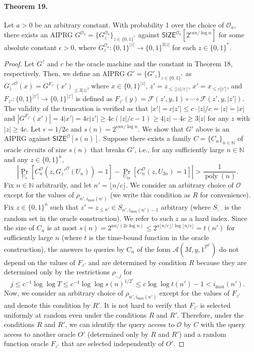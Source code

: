 \paragraph{Theorem 19.}
Let $a>0$ be an arbitrary constant. With probability 1 over the choice of $\mathcal O_a$, there exists an AIPRG $G^{\mathcal O_a}=\{G_z^{\mathcal O_a}\}_{z\in\{0,1\}^*}$ against $\mathsf{SIZE}^{\mathcal O_a}[2^{\epsilon an/\log n}]$ for some absolute constant $\epsilon>0$, where $G_z^{\mathcal O_a}:\{0,1\}^{|z|}\to\{0,1\}^{3|z|}$ for each $z\in\{0,1\}^*$.
\begin{proof}
Let $G^?$ and $c$ be the oracle machine and the constant in Theorem 18, respectively. Then, we define an AIPRG $G'=\{G'_z\}_{z\in\{0,1\}^*}$ as $G_z'^{\mathcal O}(x)=G^{F_{z'}}(x')_{\leq3|z|}$, where $x\in\{0,1\}^{|z|}$, $z'=z_{\leq\lfloor|z|/c\rfloor}$, $x'=x_{\leq c|z'|}$, and $F_{z'}:\{0,1\}^{|z'|}\to\{0,1\}^{|z'|}$ is defined as $F_{z'}(y)=\mathcal F(z',y,1)\circ\cdots\circ\mathcal F(z',y,|z'|)$. The validity of the truncation is verified as that $|x'|=c|z'|\leq c\cdot|z|/c=|z|=|x|$ and $|G^{F_{z'}}(x')|=4|x'|=4c|z'|\geq4c(|z|/c-1)\geq4|z|-4c\geq3|z|$ for any $z$ with $|z|\geq4c$.
Let $\epsilon=1/2c$ and $s(n)=2^{\epsilon an/\log n}$. We show that $G'$ above is an AIPRG against $\mathsf{SIZE}^{\mathcal O}[s(n)]$. Suppose there exists a family $C=\{C_n\}_{n\in\mathbb N}$ of oracle circuits of size $s(n)$ that breaks $G'$, i.e., for any sufficiently large $n\in\mathbb N$ and any $z\in\{0,1\}^n$,
\[\left|\Pr_{U_n}[C_n^{\mathcal O}(z,G_z'^{\mathcal O}(U_n))=1]-\Pr_{U_{3n}}[C_n^{\mathcal O}(z,U_{3n})=1]\right|>\frac1{\operatorname{poly}(n)}.\]
Fix $n\in\mathbb N$ arbitrarily, and let $n'=\lfloor n/c\rfloor$. We consider an arbitrary choice of $\mathcal O$ except for the values of $\rho_{n',i_{\max}(n')}$ (we write this condition as $R$ for convenience). Fix $z\in\{0,1\}^n$ such that $z'=z_{\leq n'}\in S_{n',i_{\max}(n')-1}$ arbitrary (where $S_{\cdot,\cdot}$ is the random set in the oracle construction). We refer to such $z$ as a hard index.
Since the size of $C_n$ is at most $s(n)=2^{an/(2c\log n)}\leq2^{a\lfloor n/c\rfloor/\log\lfloor n/c\rfloor}=t(n')$ for sufficiently large $n$ (where $t$ is the time-bound function in the oracle construction), the answers to queries by $C_n$ of the form $\mathcal A(M,y,1^{T^{2^c}})$ do not depend on the values of $F_{z'}$ and are determined by condition $R$ because they are determined only by the restrictions $\rho_{\cdot,j}$ for
\[j\leq c^{-1}\log\log T\leq c^{-1}\log\log s(n)^{1/2^c}\leq c\log\log t(n')-1<i_{\max}(n').\]
Now, we consider an arbitrary choice of $\rho_{n',i_{\max}(n')}$ except for the values of $F_{z'}$ and denote this condition by $R'$. It is not hard to verify that $F_{z'}$ is selected uniformly at random even under the conditions $R$ and $R'$. Therefore, under the conditions $R$ and $R'$, we can identify the query access to $\mathcal O$ by $C$ with the query access to another oracle $O'$ (determined only by $R$ and $R'$) and a random function oracle $F_{z'}$ that are selected independently of $O'$.

\end{proof}
